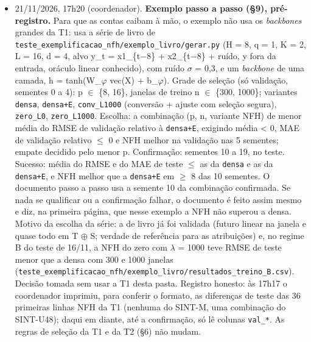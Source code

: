 \documentclass[11pt,a4paper]{article}
\begin{document}
\begin{itemize}
\item 21/11/2026, 17h20 (coordenador). \textbf{Exemplo passo a passo (\S{}9), pré-registro.} Para que as contas caibam à mão, o exemplo não usa os \emph{backbones} grandes da T1: usa a série de livro de \texttt{teste\_\allowbreak{}exemplificacao\_\allowbreak{}nfh/\allowbreak{}exemplo\_\allowbreak{}livro/\allowbreak{}gerar.\allowbreak{}py} (H = 8, q = 1, K = 2, L = 16, d = 4, alvo y\_t = x1\_\{t$-$8\} + x2\_\{t$-$8\} + ruído, y fora da entrada, oráculo linear conhecido), com ruído $\sigma$ = 0,3, e um \emph{backbone} de uma camada, h = tanh(W\_$\varphi$ vec(X) + b\_$\varphi$). Grade de seleção (só validação, sementes 0 a 4): p $\in$ \{8, 16\}, janelas de treino n $\in$ \{300, 1000\}; variantes \texttt{densa}, \texttt{densa+E}, \texttt{conv\_\allowbreak{}L1000} (conversão + ajuste com seleção segura), \texttt{zero\_\allowbreak{}L0}, \texttt{zero\_\allowbreak{}L1000}. Escolha: a combinação (p, n, variante NFH) de menor média do RMSE de validação relativo à \texttt{densa+E}, exigindo média < 0, MAE de validação relativo $\leq$ 0 e NFH melhor na validação nas 5 sementes; empate decidido pelo menor p. Confirmação: sementes 10 a 19, no teste. Sucesso: média do RMSE e do MAE de teste $\leq$ as da \texttt{densa} e as da \texttt{densa+E}, e NFH melhor que a \texttt{densa+E} em $\geq$ 8 das 10 sementes. O documento passo a passo usa a semente 10 da combinação confirmada. Se nada se qualificar ou a confirmação falhar, o documento é feito assim mesmo e diz, na primeira página, que nesse exemplo a NFH não superou a densa. Motivo da escolha da série: a de livro já foi validada (futuro linear na janela e quase todo em T $\oplus$ S; verdade de referência para as atribuições) e, no regime B do teste de 16/11, a NFH do zero com $\lambda$ = 1000 teve RMSE de teste menor que a densa com 300 e 1000 janelas (\texttt{teste\_\allowbreak{}exemplificacao\_\allowbreak{}nfh/\allowbreak{}exemplo\_\allowbreak{}livro/\allowbreak{}resultados\_\allowbreak{}treino\_\allowbreak{}B.\allowbreak{}csv}). Decisão tomada sem usar a T1 desta pasta. Registro honesto: às 17h17 o coordenador imprimiu, para conferir o formato, as diferenças de teste das 36 primeiras linhas NFH da T1 (nenhuma do SINT-M, uma combinação do SINT-U48); daqui em diante, até a confirmação, só lê colunas \texttt{val\_\allowbreak{}*}. As regras de seleção da T1 e da T2 (\S{}6) não mudam.

\end{itemize}
\end{document}
